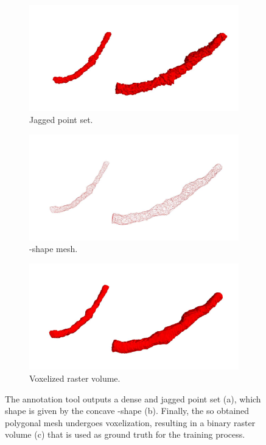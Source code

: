 \begin{figure}[t]
  \centering
  \begin{subfigure}{.45\textwidth}
    \centering
    \includegraphics[width=\textwidth]{Images/pointset.jpg}
    \caption{Jagged point set.}
    \label{fig:pointset}
  \end{subfigure}
  \begin{subfigure}{0.45\textwidth}
    \centering
    \includegraphics[width=\textwidth]{Images/alpha1.jpg}
    \caption{\textalpha-shape mesh.}
    \label{fig:alpha1}
  \end{subfigure}
  \begin{subfigure}{0.45\textwidth}
    \centering
    \includegraphics[width=\textwidth]{Images/alpha2.jpg}
    \caption{Voxelized raster volume.}
    \label{fig:alpha2}
  \end{subfigure}
  \caption{The annotation tool outputs a dense and jagged point set (a), which
  shape is given by the concave \textalpha-shape (b). Finally, the so obtained polygonal
  mesh undergoes voxelization, resulting in a binary raster volume (c) that is
  used as ground truth for the training process.}
  \label{fig:preprocessing}
\end{figure}

